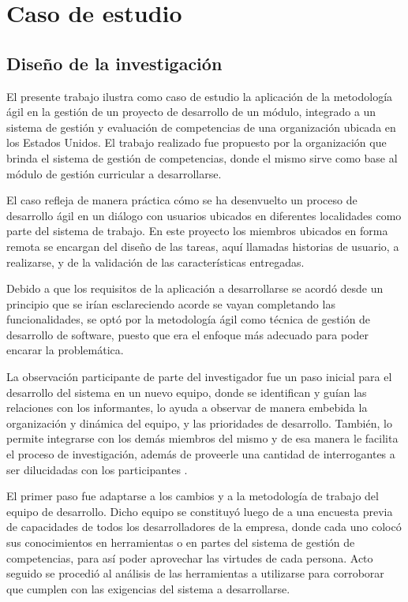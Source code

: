 \section{Caso de estudio}
\subsection{Diseño de la investigación}
El presente trabajo ilustra como caso de estudio la aplicación de la metodología ágil en la gestión de un proyecto de desarrollo de un módulo, integrado a un sistema de gestión y evaluación de competencias de una organización ubicada en los Estados Unidos. El trabajo realizado fue propuesto por la organización que brinda el sistema de gestión de competencias, donde el mismo sirve como base al módulo de gestión curricular a desarrollarse.

El caso refleja de manera práctica cómo se ha desenvuelto un proceso de desarrollo ágil en un diálogo con usuarios ubicados en diferentes localidades como parte del sistema de trabajo. En este proyecto los miembros ubicados en forma remota se encargan del diseño de las tareas, aquí llamadas historias de usuario, a realizarse, y de la validación de las características entregadas.

Debido a que los requisitos de la aplicación a desarrollarse se acordó desde un principio que se irían esclareciendo acorde se vayan completando las funcionalidades, se optó por la metodología ágil como técnica de gestión de desarrollo de software, puesto que era el enfoque más adecuado para poder encarar la problemática.

La observación participante de parte del investigador fue un paso inicial para el desarrollo del sistema en un nuevo equipo, donde se identifican y guían las relaciones con los informantes, lo ayuda a observar de manera embebida la organización y dinámica del equipo, y las prioridades de desarrollo. También, lo permite integrarse con los demás miembros del mismo y de esa manera le facilita el proceso de investigación, además de proveerle una cantidad de interrogantes a ser dilucidadas con los participantes \citep{erlandson_doing_1993}.

El primer paso fue adaptarse a los cambios y a la metodología de trabajo del equipo de desarrollo. Dicho equipo se constituyó luego de a una encuesta previa de capacidades de todos los desarrolladores de la empresa, donde cada uno colocó sus conocimientos en herramientas o en partes del sistema de gestión de competencias, para así poder aprovechar las virtudes de cada persona. Acto seguido se procedió al análisis de las herramientas a utilizarse para corroborar que cumplen con las exigencias del sistema a desarrollarse.

